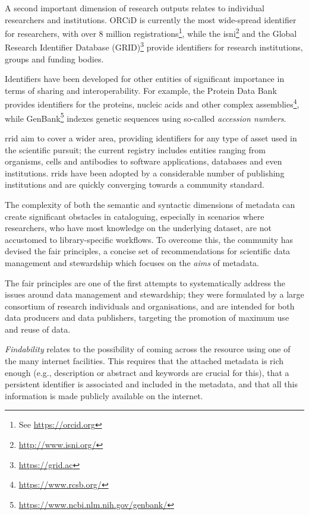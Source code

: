 A second important dimension of research outputs relates to individual researchers and institutions. ORCiD is currently the most wide-spread identifier for researchers, with over 8 million registrations\footnote{See \url{https://orcid.org}}, while the \gls{isni}\footnote{\url{http://www.isni.org/}} and the Global Research Identifier Database (GRID)\footnote{\url{https://grid.ac}} provide identifiers for research institutions, groups and funding bodies.

Identifiers have been developed for other entities of significant importance in terms of sharing and interoperability. For example, the Protein Data Bank provides identifiers for the proteins, nucleic acids and other complex assemblies\footnote{\url{https://www.rcsb.org/}}, while GenBank\footnote{\url{https://www.ncbi.nlm.nih.gov/genbank/}} indexes genetic sequences using so-called \emph{accession numbers}.

\gls{rrid}\cite{rrid} aim to cover a wider area, providing identifiers for any type of asset used in the scientific pursuit; the current registry includes entities ranging from organisms, cells and antibodies to software applications, databases and even institutions. \glspl{rrid} have been adopted by a considerable number of publishing institutions and are quickly converging towards a community standard.

The complexity of both the semantic and syntactic dimensions of metadata can create significant obstacles in cataloguing, especially in scenarios where researchers, who have most knowledge on the underlying dataset, are not accustomed to library-specific workflows. To overcome this, the community has devised the \gls{fair} principles\cite{fair}, a concise set of recommendations for scientific data management and stewardship which focuses on the \emph{aims} of metadata.

The \gls{fair} principles are one of the first attempts to systematically address the issues around data management and stewardship; they were formulated by a large consortium of research individuals and organisations, and are intended for both data producers and data publishers, targeting the promotion of maximum use and reuse of data. 

\emph{Findability} relates to the possibility of coming across the resource using one of the many internet facilities. This requires that the attached metadata is rich enough (e.g., description or abstract and keywords are crucial for this), that a persistent identifier is associated and included in the metadata, and that all this information is made publicly available on the internet.

